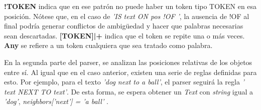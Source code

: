 \textbf{!TOKEN} indica que en ese patr\'on no puede haber un token tipo TOKEN en esa posici\'on. N\'otese que, en el caso de \textit{'IS text ON pos !OF '}, la ausencia de !OF al final podría generar conflictos de ambigüedad y hacer que palabras necesarias sean descartadas. \textbf{[TOKEN]|+} indica que el token se repite una o m\'as veces. \textbf{Any} se refiere a un token cualquiera que sea tratado como palabra.

En la segunda parte del parser, se analizan las posiciones relativas de los objetos entre sí. Al igual que en el caso anterior, existen una serie de reglas definidas para esto. Por ejemplo, para el texto \textit{'dog next to a ball'}, el parser seguirá la regla \textit{' text NEXT TO text'}. De esta forma, se espera obtener un \textit{Text} con \textit{string} igual a \textit{'dog'}, \textit{neighbors['next'] = 'a ball' }.

